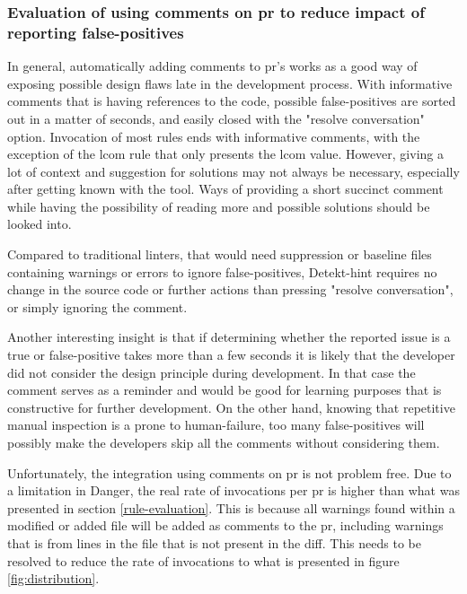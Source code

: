 \documentclass{report}
\begin{document}
\begin{itemize}
\end{itemize}

\subsubsection{Evaluation of using comments on \gls{pr} to reduce impact of reporting false-positives}
\label{evaluation-comments}
In general, automatically adding comments to \gls{pr}'s works as a good way of exposing possible design flaws late in the development process. With informative comments that is having references to the code, possible false-positives are sorted out in a matter of seconds, and easily closed with the "resolve conversation" option. Invocation of most rules ends with informative comments, with the exception of the \gls{lcom} rule that only presents the \gls{lcom} value. However, giving a lot of context and suggestion for solutions may not always be necessary, especially after getting known with the tool. Ways of providing a short succinct comment while having the possibility of reading more and possible solutions should be looked into.

Compared to traditional linters, that would need suppression or baseline files containing warnings or errors to ignore false-positives, Detekt-hint requires no change in the source code or further actions than pressing "resolve conversation", or simply ignoring the comment.  

Another interesting insight is that if determining whether the reported issue is a true or false-positive takes more than a few seconds it is likely that the developer did not consider the design principle during development. In that case the comment serves as a reminder and would be good for learning purposes that is constructive for further development. On the other hand, knowing that repetitive manual inspection is a prone to human-failure, too many false-positives will possibly make the developers skip all the comments without considering them. 

Unfortunately, the integration using comments on \gls{pr} is not problem free. Due to a limitation in Danger, the real rate of invocations per \gls{pr} is higher than what was presented in section \ref{rule-evaluation}. This is because all warnings found within a modified or added file will be added as comments to the pr, including warnings that is from lines in the file that is not present in the diff. This needs to be resolved to reduce the rate of invocations to what is presented in figure \ref{fig:distribution}.
\end{document}
